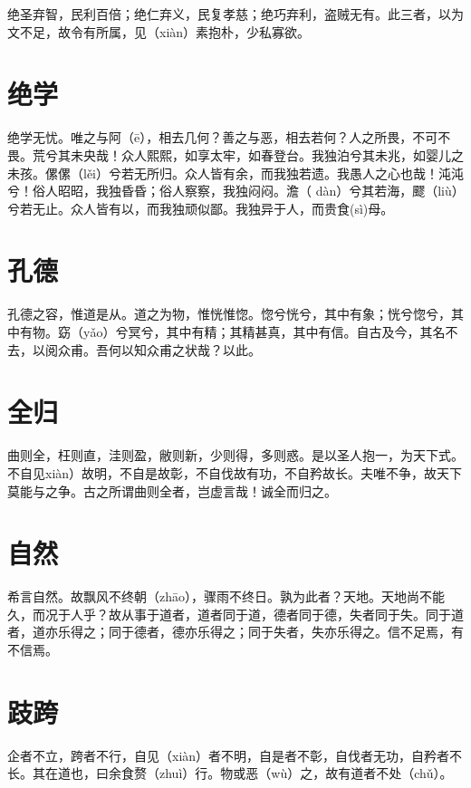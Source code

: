 \documentclass[a4paper,12pt,UTF8,twoside]{ctexbook}
\begin{document}
	绝圣弃智，民利百倍；绝仁弃义，民复孝慈；绝巧弃利，盗贼无有。此三者，以为文不足，故令有所属，见（xiàn）素抱朴，少私寡欲。
	
	
	
	
	\chapter{绝学}
	绝学无忧。唯之与阿（ē），相去几何？善之与恶，相去若何？人之所畏，不可不畏。荒兮其未央哉！众人熙熙，如享太牢，如春登台。我独泊兮其未兆，如婴儿之未孩。傫傫（lěi）兮若无所归。众人皆有余，而我独若遗。我愚人之心也哉！沌沌兮！俗人昭昭，我独昏昏；俗人察察，我独闷闷。澹（
	dàn）兮其若海，飂（liù）兮若无止。众人皆有以，而我独顽似鄙。我独异于人，而贵食(sì)母。
	
	
	
	
	\chapter{孔德}
	孔德之容，惟道是从。道之为物，惟恍惟惚。惚兮恍兮，其中有象；恍兮惚兮，其中有物。窈（yǎo）兮冥兮，其中有精；其精甚真，其中有信。自古及今，其名不去，以阅众甫。吾何以知众甫之状哉？以此。
	
	
	
	
	
	\chapter{全归}
	曲则全，枉则直，洼则盈，敝则新，少则得，多则惑。是以圣人抱一，为天下式。不自见xiàn）故明，不自是故彰，不自伐故有功，不自矜故长。夫唯不争，故天下莫能与之争。古之所谓曲则全者，岂虚言哉！诚全而归之。
	
	
	
	\chapter{自然}
	
	希言自然。故飘风不终朝（zhāo），骤雨不终日。孰为此者？天地。天地尚不能久，而况于人乎？故从事于道者，道者同于道，德者同于德，失者同于失。同于道者，道亦乐得之；同于德者，德亦乐得之；同于失者，失亦乐得之。信不足焉，有不信焉。
	
	
	
	\chapter{跂跨}
	
	企者不立，跨者不行，自见（xiàn）者不明，自是者不彰，自伐者无功，自矜者不长。其在道也，曰余食赘（zhuì）行。物或恶（wù）之，故有道者不处（chǔ）。
	
\end{document}
